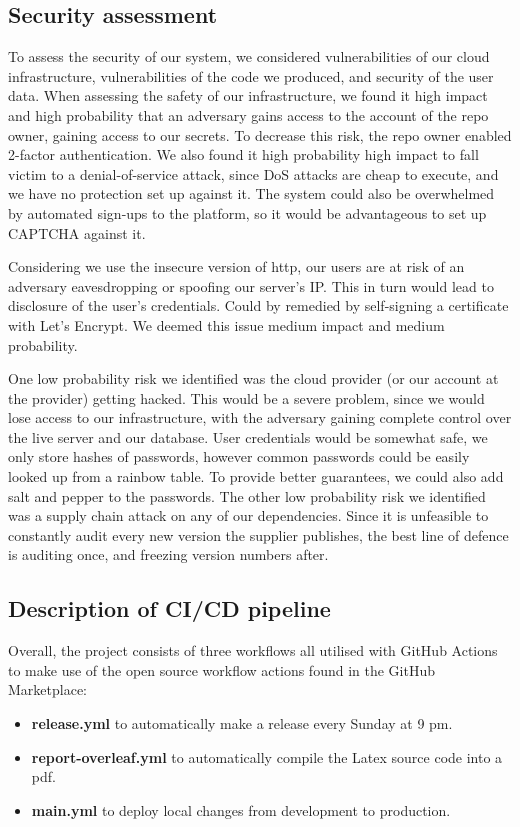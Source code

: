 \documentclass[report/main.tex]{subfiles}
\begin{document}
        \subsection{Security assessment}
        To assess the security of our system, we considered vulnerabilities of our cloud infrastructure, vulnerabilities of the code we produced, and security of the user data.
        When assessing the safety of our infrastructure, we found it high impact and high probability that an adversary gains access to the account of the repo owner, gaining access to our secrets. To decrease this risk, the repo owner enabled 2-factor authentication. We also found it high probability high impact to fall victim to a denial-of-service attack, since DoS attacks are cheap to execute, and we have no protection set up against it. The system could also be overwhelmed by automated sign-ups to the platform, so it would be advantageous to set up CAPTCHA against it.
        
        Considering we use the insecure version of http, our users are at risk of an adversary eavesdropping or spoofing our server's IP. This in turn would lead to disclosure of the user's credentials. Could by remedied by self-signing a certificate with Let's Encrypt. We deemed this issue medium impact and medium probability.
        
        One low probability risk we identified was the cloud provider (or our account at the provider) getting hacked. This would be a severe problem, since we would lose access to our infrastructure, with the adversary gaining complete control over the live server and our database. User credentials would be somewhat safe, we only store hashes of passwords, however common passwords could be easily looked up from a rainbow table. To provide better guarantees, we could also add salt and pepper to the passwords.
        The other low probability risk we identified was a supply chain attack on any of our dependencies. Since it is unfeasible to constantly audit every new version the supplier publishes, the best line of defence is auditing once, and freezing version numbers after.
        
        \newpage
        
        \subsection{Description of CI/CD pipeline}
        
        
        Overall, the project consists of three workflows all utilised with GitHub Actions to make use of the open source workflow actions found in the GitHub Marketplace:
        \begin{itemize} 
            \item \textbf{release.yml} to automatically make a release every Sunday at 9 pm. 
            \item \textbf{report-overleaf.yml} to automatically compile the Latex source code into a pdf.
            \item \textbf{main.yml} to deploy local changes from development to production.
        \end{itemize}
        
\end{document}
